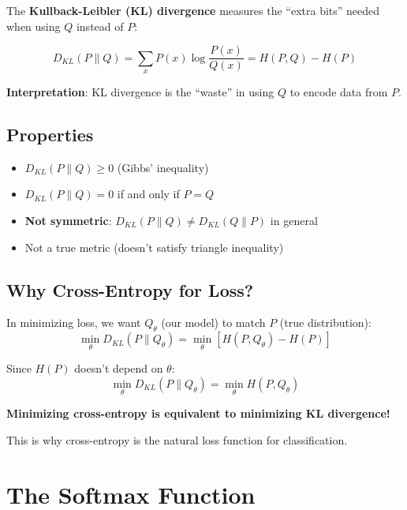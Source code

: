 The \textbf{Kullback-Leibler (KL) divergence} measures the ``extra bits'' needed when using $Q$ instead of $P$:

\begin{definition}[KL Divergence]
\[
\boxed{D_{KL}(P \| Q) = \sum_{x} P(x) \log \frac{P(x)}{Q(x)} = H(P, Q) - H(P)}
\]
\end{definition}

\textbf{Interpretation}: KL divergence is the ``waste'' in using $Q$ to encode data from $P$.

\subsection{Properties}

\begin{itemize}
    \item $D_{KL}(P \| Q) \geq 0$ (Gibbs' inequality)
    \item $D_{KL}(P \| Q) = 0$ if and only if $P = Q$
    \item \textbf{Not symmetric}: $D_{KL}(P \| Q) \neq D_{KL}(Q \| P)$ in general
    \item Not a true metric (doesn't satisfy triangle inequality)
\end{itemize}

\subsection{Why Cross-Entropy for Loss?}

In minimizing loss, we want $Q_{\theta}$ (our model) to match $P$ (true distribution):
\[
\min_\theta D_{KL}(P \| Q_\theta) = \min_\theta \left[ H(P, Q_\theta) - H(P) \right]
\]

Since $H(P)$ doesn't depend on $\theta$:
\[
\min_\theta D_{KL}(P \| Q_\theta) = \min_\theta H(P, Q_\theta)
\]

\begin{important}
\textbf{Minimizing cross-entropy is equivalent to minimizing KL divergence!}

This is why cross-entropy is the natural loss function for classification.
\end{important}

\section{The Softmax Function}

